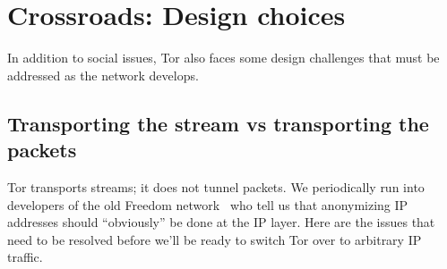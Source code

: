\documentclass{llncs}
\begin{document}


\section{Crossroads: Design choices}
\label{sec:crossroads-design}

In addition to social issues, Tor also faces some design challenges that must
be addressed as the network develops.

\subsection{Transporting the stream vs transporting the packets}
\label{subsec:stream-vs-packet}
\label{subsec:tcp-vs-ip}

Tor transports streams; it does not tunnel packets. We periodically
run into developers of the old Freedom network~\cite{freedom21-security}
who tell us that anonymizing IP addresses should ``obviously'' be done
at the IP layer. Here are the issues that need to be resolved before
we'll be ready to switch Tor over to arbitrary IP traffic.
\end{document}
